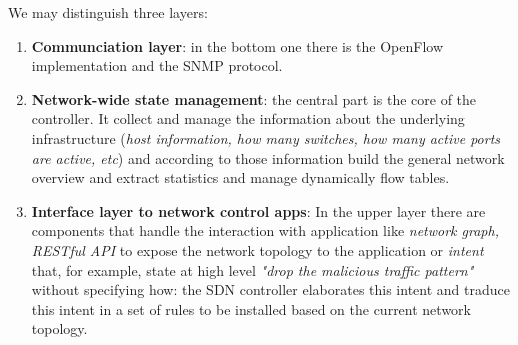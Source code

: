 \documentclass[10pt,a4paper]{report}
\theoremstyle{definition}
\begin{document}
We may distinguish three layers:
\begin{enumerate}
	\item 
	\textbf{Communciation layer}: in the bottom one there is the OpenFlow implementation and the SNMP protocol.
	\item 
	\textbf{Network-wide state management}: the central part is the core of the controller. It collect and manage the information about the underlying infrastructure (\textit{host information, how many switches, how many active ports are active, etc}) and according to those information build the general network overview and extract statistics and manage dynamically flow tables.
	\item 
	\textbf{Interface layer to network control apps}: In the upper layer there are components that handle the interaction with application like \textit{network graph, RESTful API} to expose the network topology to the application or \textit{intent} that, for example, state at high level \textit{"drop the malicious traffic pattern"}  without specifying how: the SDN controller elaborates this intent and traduce this intent in a set of rules to be installed based on the current network topology.
\end{enumerate}
\end{document}

